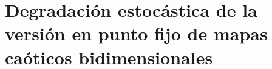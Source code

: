 \section{Degradación estocástica de la versión en punto fijo de mapas caóticos bidimensionales}






